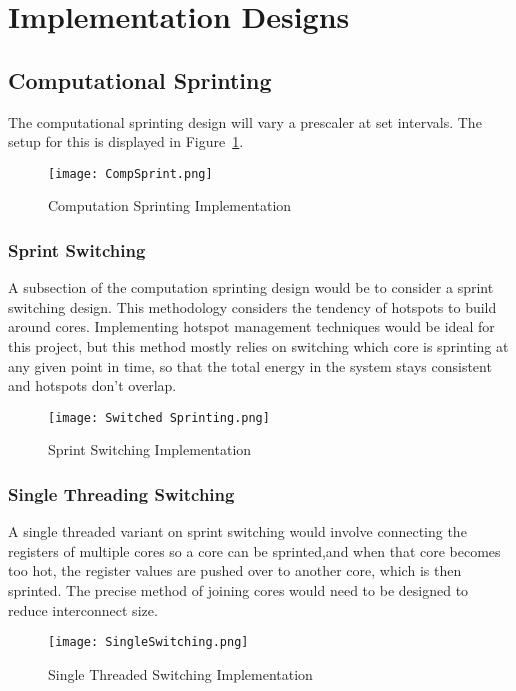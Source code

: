 \section{Implementation Designs}
	\subsection{Computational Sprinting}
		The computational sprinting design will vary a prescaler at set intervals. The setup for this is displayed in Figure~\ref{CompSprint}.
	
	\begin{figure}
		\centering
		\texttt{[image: CompSprint.png]}
		\caption{Computation Sprinting Implementation}
		\label{CompSprint}
	\end{figure}
	
	\subsubsection{Sprint Switching}
		A subsection of the computation sprinting design would be to consider a sprint switching design. This methodology considers the tendency of hotspots to build around cores. Implementing hotspot management techniques would be ideal for this project, but this method  mostly relies on switching which core is sprinting at any given point in time, so that the total energy in the system stays consistent and hotspots don't overlap.
	\begin{figure}
		\centering
		\texttt{[image: Switched Sprinting.png]}
		\caption{Sprint Switching Implementation}
		\label{Sprint Switching Implementation}
	\end{figure}
	
	\subsubsection{Single Threading Switching}
		A single threaded variant on sprint switching would involve connecting the registers of multiple cores so a core can be sprinted,and when that core becomes too hot, the register values are pushed over to another core, which is then sprinted. The precise method of joining cores would need to be designed to reduce interconnect size. 
	\begin{figure}
		\centering
		\texttt{[image: SingleSwitching.png]}
		\caption{Single Threaded Switching Implementation}
		\label{Single Threaded Switching}
	\end{figure}

